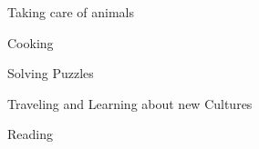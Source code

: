 


\vspace{4mm}

\begin{cvitems}
  \item {Taking care of animals}
  \item {Cooking}
  \item {Solving Puzzles}
  \item {Traveling and Learning about new Cultures}
  \item {Reading}
\end{cvitems}
